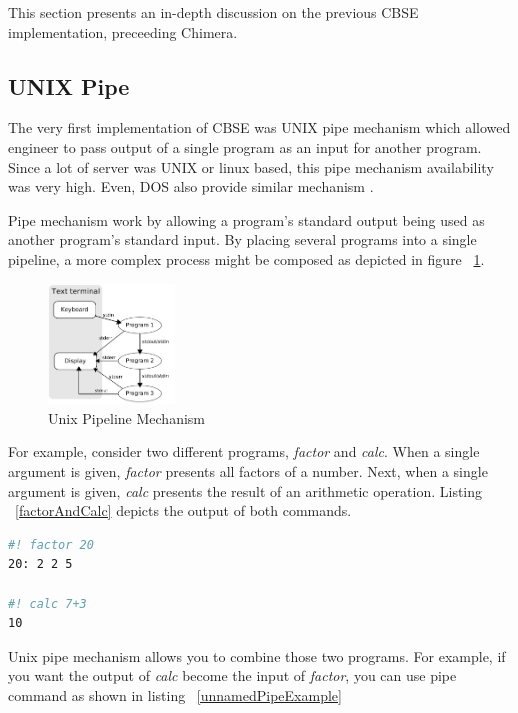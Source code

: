 \documentclass[conference]{IEEEtran}
\begin{document}
This section presents an in-depth discussion on the previous CBSE implementation,  
preceeding Chimera.


\subsection{UNIX Pipe}

The very first implementation of CBSE was UNIX pipe mechanism \cite{mcilroy1968mass} 
which allowed engineer to pass output of a single program as an input for 
another program. Since a lot of server was UNIX or linux based, this pipe 
mechanism availability was very high. Even, DOS also provide similar mechanism 
\cite{dos7command}.

Pipe mechanism work by allowing a program's standard output being used as another
program's standard input. By placing several programs into a single pipeline, 
a more complex process might be composed as depicted in figure ~\ref{fig:unixPipe}.

\begin{figure}
	\centering
	\includegraphics[width=0.3\textwidth]
		{images/Pipeline.jpg}
	\caption{Unix Pipeline Mechanism}
	\label{fig:unixPipe}
\end{figure}

For example, consider two different programs,
{\it factor} and {\it calc}. When a single argument is given, {\it factor} presents all 
factors of a number. Next, when a single argument is given, {\it calc} presents the result 
of an arithmetic operation. Listing ~\ref{factorAndCalc} depicts the output of both commands.

\begin{lstlisting}[caption=Usage of factor and calc, label=factorAndCalc, language=bash, basicstyle=\small, breaklines=true]
#! factor 20
20: 2 2 5

#! calc 7+3 
10
\end{lstlisting}

Unix pipe mechanism allows you to combine those two programs. For example, if you
want the output of {\it calc} become the input of {\it factor}, you can use pipe
command as shown in listing ~\ref{unnamedPipeExample}
\end{document}
